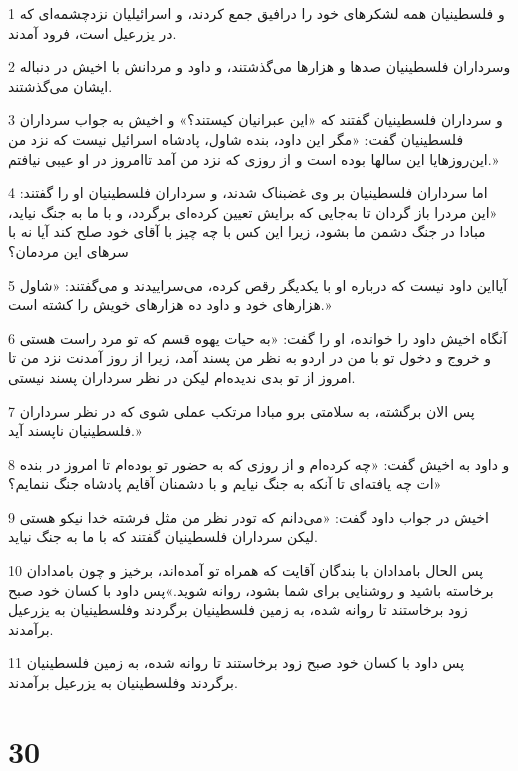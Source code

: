 \par 1 و فلسطینیان همه لشکرهای خود را درافیق جمع کردند، و اسرائیلیان نزدچشمه‌ای که در یزرعیل است، فرود آمدند.
\par 2 وسرداران فلسطینیان صدها و هزارها می‌گذشتند، و داود و مردانش با اخیش در دنباله ایشان می‌گذشتند.
\par 3 و سرداران فلسطینیان گفتند که «این عبرانیان کیستند؟» و اخیش به جواب سرداران فلسطینیان گفت: «مگر این داود، بنده شاول، پادشاه اسرائیل نیست که نزد من این‌روزهایا این سالها بوده است و از روزی که نزد من آمد تاامروز در او عیبی نیافتم.»
\par 4 اما سرداران فلسطینیان بر وی غضبناک شدند، و سرداران فلسطینیان او را گفتند: «این مردرا باز گردان تا به‌جایی که برایش تعیین کرده‌ای برگردد، و با ما به جنگ نیاید، مبادا در جنگ دشمن ما بشود، زیرا این کس با چه چیز با آقای خود صلح کند آیا نه با سرهای این مردمان؟
\par 5 آیااین داود نیست که درباره او با یکدیگر رقص کرده، می‌سراییدند و می‌گفتند: «شاول هزارهای خود و داود ده هزارهای خویش را کشته است.»
\par 6 آنگاه اخیش داود را خوانده، او را گفت: «به حیات یهوه قسم که تو مرد راست هستی و خروج و دخول تو با من در اردو به نظر من پسند آمد، زیرا از روز آمدنت نزد من تا امروز از تو بدی ندیده‌ام لیکن در نظر سرداران پسند نیستی.
\par 7 پس الان برگشته، به سلامتی برو مبادا مرتکب عملی شوی که در نظر سرداران فلسطینیان ناپسند آید.»
\par 8 و داود به اخیش گفت: «چه کرده‌ام و از روزی که به حضور تو بوده‌ام تا امروز در بنده ات چه یافته‌ای تا آنکه به جنگ نیایم و با دشمنان آقایم پادشاه جنگ ننمایم؟»
\par 9 اخیش در جواب داود گفت: «می‌دانم که تودر نظر من مثل فرشته خدا نیکو هستی لیکن سرداران فلسطینیان گفتند که با ما به جنگ نیاید.
\par 10 پس الحال بامدادان با بندگان آقایت که همراه تو آمده‌اند، برخیز و چون بامدادان برخاسته باشید و روشنایی برای شما بشود، روانه شوید.»پس داود با کسان خود صبح زود برخاستند تا روانه شده، به زمین فلسطینیان برگردند وفلسطینیان به یزرعیل برآمدند.
\par 11 پس داود با کسان خود صبح زود برخاستند تا روانه شده، به زمین فلسطینیان برگردند وفلسطینیان به یزرعیل برآمدند.
 
\chapter{30}

